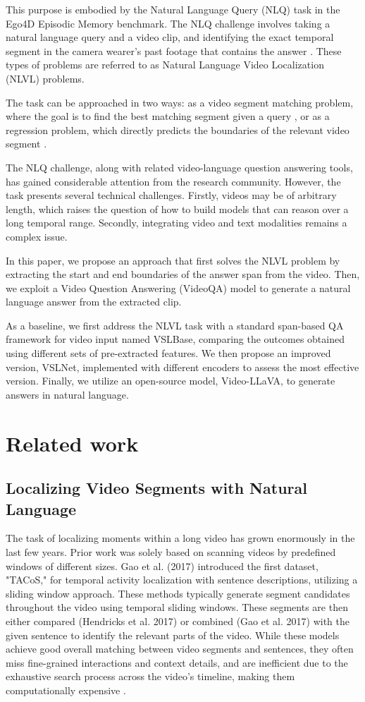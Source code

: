 \documentclass[conference]{IEEEtran}
\begin{document}
This purpose is embodied by the Natural Language Query (NLQ) task in the Ego4D Episodic Memory benchmark. The NLQ challenge involves taking a natural language query and a video clip, and identifying the exact temporal segment in the camera wearer's past footage that contains the answer \cite{b1}. These types of problems are referred to as Natural Language Video Localization (NLVL) problems.

The task can be approached in two ways: as a video segment matching problem, where the goal is to find the best matching segment given a query \cite{b2}, or as a regression problem, which directly predicts the boundaries of the relevant video segment \cite{b3}.

The NLQ challenge, along with related video-language question answering tools, has gained considerable attention from the research community. However, the task presents several technical challenges. Firstly, videos may be of arbitrary length, which raises the question of how to build models that can reason over a long temporal range. Secondly, integrating video and text modalities remains a complex issue.

In this paper, we propose an approach that first solves the NLVL problem by extracting the start and end boundaries of the answer span from the video. Then, we exploit a Video Question Answering (VideoQA) model to generate a natural language answer from the extracted clip.

As a baseline, we first address the NLVL task with a standard span-based QA framework for video input named VSLBase, comparing the outcomes obtained using different sets of pre-extracted features. We then propose an improved version, VSLNet, implemented with different encoders to assess the most effective version. Finally, we utilize an open-source model, Video-LLaVA, to generate answers in natural language.

\section{Related work}

\subsection{Localizing Video Segments with Natural Language}

The task of localizing moments within a long video has grown enormously in the last few years. Prior work was solely based on scanning videos by predefined windows of different sizes. Gao et al. (2017) introduced the first dataset, "TACoS," for temporal activity localization with sentence descriptions, utilizing a sliding window approach. These methods typically generate segment candidates throughout the video using temporal sliding windows. These segments are then either compared (Hendricks et al. 2017) or combined (Gao et al. 2017) with the given sentence to identify the relevant parts of the video. While these models achieve good overall matching between video segments and sentences, they often miss fine-grained interactions and context details, and are inefficient due to the exhaustive search process across the video's timeline, making them computationally expensive \cite{b4}.
\end{document}
